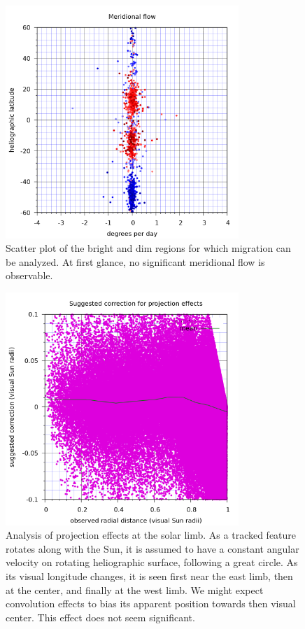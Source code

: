 \documentclass{aa}
\begin{document}
\begin{figure} \centering \includegraphics[width=8.8cm]{meridional.png}
\caption{Scatter plot of the bright and dim regions for which migration can be analyzed. At first glance, no significant meridional flow is observable.}
\label{meridional} \end{figure}

\begin{figure} \centering \includegraphics[width=8.8cm]{limb_offsets.png}
\caption{Analysis of projection effects at the solar limb. As a tracked feature rotates along with the Sun, it is assumed to have a constant angular velocity on rotating heliographic surface, following a great circle. As its visual longitude changes, it is seen first near the east limb, then at the center, and finally at the west limb. We might expect convolution effects to bias its apparent position towards then visual center. This effect does not seem significant.}
\label{limb_offsets} \end{figure}
\end{document}
